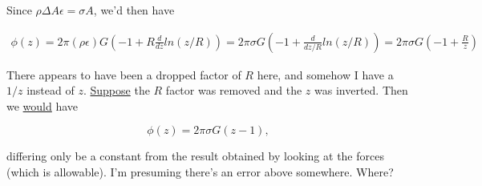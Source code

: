 Since $\rho \Delta A \epsilon = \sigma A$, we'd then have

\begin{align*}
\phi(z) 
=
2 \pi (\rho \epsilon) G 
\left( -1 + R \frac{d}{dz} ln(z/R) \right)
=
2 \pi \sigma G 
\left( -1 + \frac{d}{dz/R} ln(z/R) \right)
=
2 \pi \sigma G 
\left( -1 + \frac{R}{z} \right)
\end{align*}

There appears to have been a dropped factor of $R$ here, and somehow I have a $1/z$ instead of $z$.  \underline{Suppose} the $R$ factor was removed and the $z$ was inverted.  Then we \underline{would} have 

\begin{equation}\label{eqn:classicalMechanicsPs2:330}
\phi(z) =
2 \pi \sigma G (z - 1),
\end{equation}

differing only be a constant from the result obtained by looking at the forces (which is allowable).  I'm presuming there's an error above somewhere.  Where?

\EndNoBibArticle
